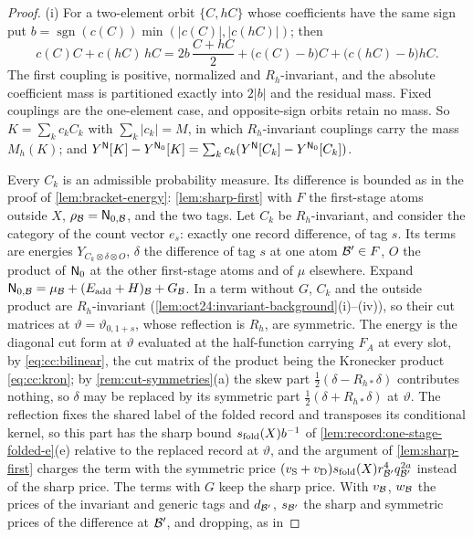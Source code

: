 \begin{proof}
(i) For a two-element orbit $\{C,hC\}$ whose coefficients have the same sign put
$b=\operatorname{sgn}(c(C))\min(|c(C)|,|c(hC)|)$; then
\[
 c(C)C+c(hC)\,hC=2b\,\frac{C+hC}2+\bigl(c(C)-b\bigr)C+\bigl(c(hC)-b\bigr)hC .
\]
The first coupling is positive, normalized and $R_h$-invariant, and the absolute
coefficient mass is partitioned exactly into $2|b|$ and the residual mass. Fixed
couplings are the one-element case, and opposite-sign orbits retain no mass. So
$K=\sum_kc_kC_k$ with $\sum_k|c_k|=M$, in which $R_h$-invariant couplings carry the
mass $M_h(K)$; and $Y^{\mathsf N}[K]-Y^{\mathsf N_0}[K]=\sum_kc_k(Y^{\mathsf N}[C_k]-Y^{\mathsf N_0}[C_k])$.

Every $C_k$ is an admissible probability measure. Its difference is bounded as in the
proof of \cref{lem:bracket-energy}: \cref{lem:sharp-first} with $F$ the first-stage
atoms outside $X$, $\rho_\mathcal B=\mathsf N_{0,\mathcal B}$, and the two tags. Let $C_k$ be
$R_h$-invariant, and consider the category of the count vector $e_s$: exactly one
record difference, of tag $s$. Its terms are energies
$Y_{C_k\otimes\delta\otimes O}$, $\delta$ the difference of tag $s$ at one atom
$\mathcal B'\in F$, $O$ the product of $\mathsf N_0$ at the other first-stage atoms and of $\mu$
elsewhere. Expand $\mathsf N_{0,\mathcal B}=\mu_\mathcal B+(E_{\rm add}+H)_\mathcal B+G_\mathcal B$. In a term without $G$,
$C_k$ and the outside product are $R_h$-invariant
(\cref{lem:oct24:invariant-background}(i)--(iv)), so their cut matrices at
$\vartheta=\vartheta_{0,1+s}$, whose reflection is $R_h$, are symmetric. The energy is
the diagonal cut form at $\vartheta$ evaluated at the half-function carrying $F_A$ at
every slot, by \eqref{eq:cc:bilinear}, the cut matrix of the product being the Kronecker
product \eqref{eq:cc:kron}; by \cref{rem:cut-symmetries}(a) the skew part
$\frac12(\delta-R_{h*}\delta)$ contributes nothing, so $\delta$ may be replaced by its
symmetric part $\frac12(\delta+R_{h*}\delta)$ at $\vartheta$. The reflection fixes the shared label of
the folded record and transposes its conditional kernel, so this part has the sharp
bound $s_{\rm fold}(X)b^{-1}$ of \cref{lem:record:one-stage-folded-e}(e) relative to the
replaced record at $\vartheta$, and the argument of \cref{lem:sharp-first} charges the
term with the symmetric price $(v_{\rm S}+v_{\rm D})s_{\rm fold}(X)r_{\mathcal B'}^4q_{\mathcal B'}^{2a}$
instead of the sharp price. The terms with $G$ keep the sharp price. With
$v_\mathcal B$, $w_\mathcal B$ the prices of the invariant and generic tags and $d_{\mathcal B'}$, $s_{\mathcal B'}$ the
sharp and symmetric prices of the difference at $\mathcal B'$, and dropping, as in

\end{proof}

